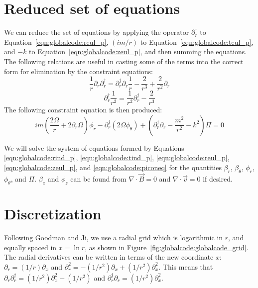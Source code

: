 \documentclass[letterpaper]{article}
\begin{document}
\section{Reduced set of equations}

We can reduce the set of equations by applying the operator
$\partial_r^\dagger$ to Equation~\ref{eqn:globalcode:reul_p}, $(im/r)$
to Equation~\ref{eqn:globalcode:teul_p}, and $-k$ to
Equation~\ref{eqn:globalcode:zeul_p}, and then summing the equations.
The following relations are useful in casting some of the terms into
the correct form for elimination by the constraint equations:
\begin{equation}
\frac{1}{r}\partial_r \partial_r^\dagger
 = \partial_r^\dagger \partial_r \frac{1}{r}
 - \frac{2}{r^3} + \frac{2}{r^2}\partial_r
\end{equation}
\begin{equation}
\partial_r^\dagger \frac{1}{r^2}
 = \frac{1}{r^2} \partial_r^\dagger - \frac{2}{r^3}
\end{equation}
The following constraint equation is then produced:
\begin{equation}\label{eqn:globalcode:piconeq}
im\left(\frac{2\Omega}{r}+2\partial_r \Omega\right)\phi_r 
 - \partial_r^\dagger\left(2\Omega\phi_\theta\right)
 + \left(\partial_r^\dagger \partial_r - \frac{m^2}{r^2}-k^2\right)\Pi = 0
\end{equation}

We will solve the system of equations formed by Equations
\ref{eqn:globalcode:rind_p}, \ref{eqn:globalcode:tind_p},
\ref{eqn:globalcode:reul_p}, \ref{eqn:globalcode:zeul_p}, and
\ref{eqn:globalcode:piconeq} for the quantities $\beta_r$,
$\beta_\theta$, $\phi_r$, $\phi_\theta$, and $\Pi$. $\beta_z$ and
$\phi_z$ can be found from $\nabla\cdot\vec{B}=0$ and
$\nabla\cdot\vec{v}=0$ if desired.


\section{Discretization}

Following Goodman and Ji, we use a radial grid which is logarithmic in
$r$, and equally spaced in $x=\ln{r}$, as shown in
Figure~\ref{fig:globalcode:globalcode_grid}.  The radial derivatives
can be written in terms of the new coordinate $x$: $\partial_r =
(1/r)\partial_x$ and $\partial_r^2 = -(1/r^2)\partial_x +
(1/r^2)\partial_x^2$.  This means that $\partial_r \partial_r^\dagger
= (1/r^2)\partial_x^2 - (1/r^2)$ and $\partial_r^\dagger \partial_r =
(1/r^2)\partial_x^2$.
\end{document}
